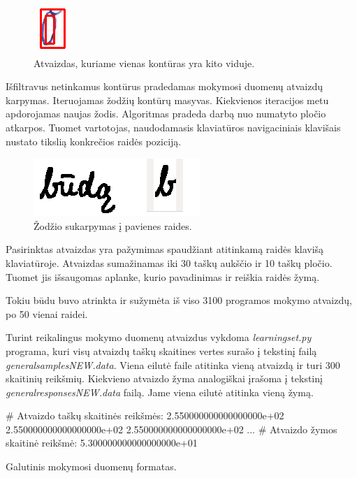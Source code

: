 \documentclass[a4paper,12pt]{article}
\begin{document}
		\begin{figure}[H]
			\centering
			\includegraphics[scale=0.5]{images/removecntrs}
			\caption{Atvaizdas, kuriame vienas kontūras yra kito viduje.}   %
			\label{img:removecntrs}
		\end{figure}
		

Išfiltravus netinkamus kontūrus pradedamas mokymosi duomenų atvaizdų karpymas. Iteruojamas žodžių kontūrų masyvas. Kiekvienos iteracijos metu apdorojamas naujas žodis. Algoritmas pradeda darbą nuo numatyto pločio atkarpos. Tuomet vartotojas, naudodamasis klaviatūros navigaciniais klavišais nustato tikslią konkrečios raidės poziciją.

		\begin{figure}[H]
			\centering
			\includegraphics[scale=0.5]{images/selectletter}
			\caption{Žodžio sukarpymas į pavienes raides.}   %
			\label{img:selectletter}
		\end{figure}
		
Pasirinktas atvaizdas yra pažymimas spaudžiant atitinkamą raidės klavišą klaviatūroje. Atvaizdas sumažinamas iki 30 taškų aukščio ir 10 taškų pločio. Tuomet jis išsaugomas aplanke, kurio pavadinimas ir reiškia raidės žymą.
 
Tokiu būdu buvo atrinkta ir sužymėta iš viso 3100 programos mokymo atvaizdų, po 50 vienai raidei. 

Turint reikalingus mokymo duomenų atvaizdus vykdoma \textit{learningset.py} programa, kuri visų atvaizdų taškų skaitines vertes surašo į tekstinį failą \textit{generalsamplesNEW.data}. Viena eilutė faile atitinka vieną atvaizdą ir turi 300 skaitinių reikšmių. Kiekvieno atvaizdo žyma analogiškai įrašoma į tekstinį \textit{generalresponsesNEW.data} failą. Jame viena eilutė atitinka vieną žymą.

	\begin{listing}[H]
\begin{pythoncode}
# Atvaizdo taškų skaitinės reikšmės:
2.550000000000000000e+02 2.550000000000000000e+02 2.550000000000000000e+02 ...
# Atvaizdo žymos skaitinė reikšmė:
5.300000000000000000e+01
\end{pythoncode}
	\caption{Galutinis mokymosi duomenų formatas.}		
	\end{listing}
\end{document}

